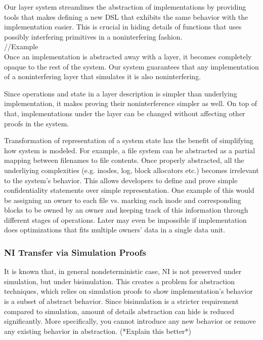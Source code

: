 \documentclass[onecolumn]{paper}
\begin{document}
Our layer system streamlines the abstraction of implementations by providing tools that makes defining a new DSL that exhibits the same behavior with the implementation easier.
This is crucial in hiding details of functions that uses possibly interfering primitives in a noninterfering fashion.\\

//Example\\

Once an implementation is abstracted away with a layer, it becomes completely opaque to the rest of the system. Our system guarantees that any implementation of a noninterfering layer that simulates it is also noninterfering.

Since operations and state in a layer description is simpler than underlying implementation, it makes proving their noninterference simpler as well. On top of that, implementations under the layer can be changed without affecting other proofs in the system.

Transformation of representation of a system state has the benefit of simplifying how system is modeled. For example, a file system can be abstracted as a partial mapping between filenames to file contents. Once properly abstracted, all the underliying complexities (e.g. inodes, log, block allocators etc.) becomes irrelevant to the system's behavior. This allows developers to define and prove simple confidentiality statements over simple representation. One example of this would be assigning an owner to each file vs. marking each inode and corresponding blocks to be owned by an owner and keeping track of this information through different stages of operations. Later may even be impossible if implementation does optimizations that fits multiple owners' data in a single data unit.

\subsubsection*{NI Transfer via Simulation Proofs}
It is known that, in general nondeterministic case, NI is not preserved under simulation, but under bisimulation. This creates a problem for abstraction techniques, which relies on simulation proofs to show implementation's behavior is a subset of abstract behavior. Since bisimulation is a stricter requirement compared to simulation, amount of details abstraction can hide is reduced significantly. More specifically, you cannot introduce any new behavior or remove any existing behavior in abstraction. (*Explain this better*)
\end{document}
